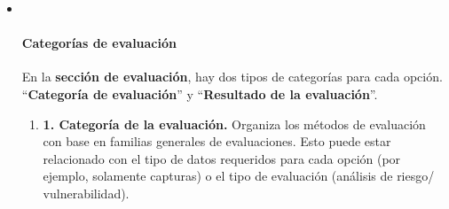 \documentclass[
  11pt,
]{book}
\providecommand{\tightlist}{%
  \setlength{\itemsep}{0pt}\setlength{\parskip}{0pt}}
\begin{document}
\begin{itemize}
\item ~
  \hypertarget{Assessment-Categories}{%
  \paragraph{Categorías de evaluación}\label{Assessment-Categories}}

  En la \textbf{sección de evaluación}, hay dos tipos de categorías para cada opción. ``\textbf{Categoría de evaluación}'' y ``\textbf{Resultado de la evaluación}''.

  \begin{enumerate}
  \def\labelenumi{\arabic{enumi}.}
  \tightlist
  \item
    \textbf{1. Categoría de la evaluación.} Organiza los métodos de evaluación con base en familias generales de evaluaciones. Esto puede estar relacionado con el tipo de datos requeridos para cada opción (por ejemplo, solamente capturas) o el tipo de evaluación (análisis de riesgo/ vulnerabilidad).


\end{enumerate}
\end{itemize}
\end{document}
